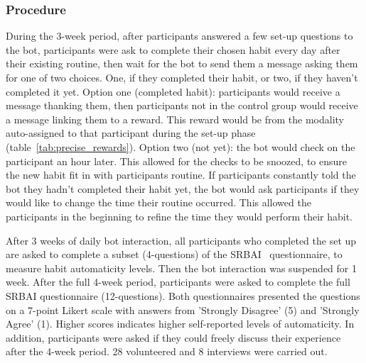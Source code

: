 \documentclass{scaffold/sigchi}
\begin{document}
\subsubsection{Procedure}
During the 3-week period, after participants answered a few set-up questions to the bot, participants were ask to complete their chosen habit every day after their existing routine, then wait for the bot to send them a message asking them for one of two choices. One, if they completed their habit, or two, if they haven't completed it yet.\newline
\newline
Option one (completed habit): participants would receive a message thanking them, then participants not in the control group would receive a message linking them to a reward. This reward would be from the modality auto-assigned to that participant during the set-up phase (table~\ref{tab:precise_rewards}).\newline
\newline
Option two (not yet): the bot would check on the participant an hour later. This allowed for the checks to be snoozed, to ensure the new habit fit in with participants routine. If participants constantly told the bot they hadn't completed their habit yet, the bot would ask participants if they would like to change the time their routine occurred. This allowed the participants in the beginning to refine the time they would perform their habit.


After 3 weeks of daily bot interaction, all participants who completed the set up are asked to complete a subset (4-questions) of the SRBAI~\cite{article_habit_measurement} questionnaire, to measure habit automaticity levels. Then the bot interaction was suspended for 1 week. After the full 4-week period, participants were asked to complete the full SRBAI questionnaire (12-questions). Both questionnaires presented the questions on a 7-point Likert scale with answers from 'Strongly Disagree' (5) and 'Strongly Agree' (1). Higher scores indicates higher self-reported levels of automaticity. In addition, participants were asked if they could freely discuss their experience after the 4-week period. 28 volunteered and 8 interviews were carried out.
\end{document}

